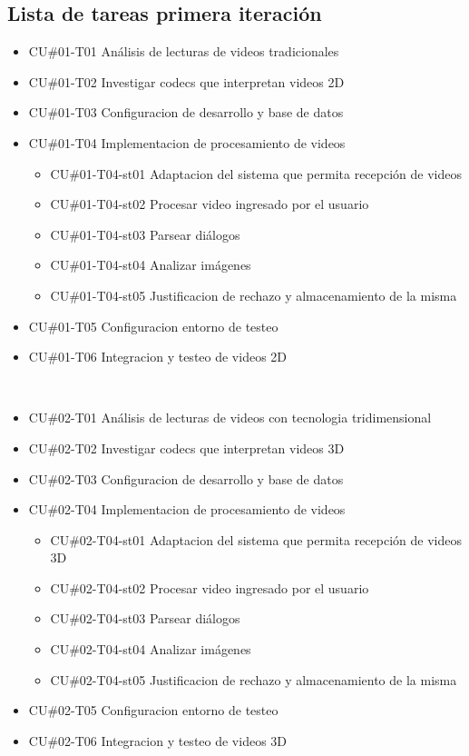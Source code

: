 \begin{enumerate}
\newpage
\subsection{Lista de tareas primera iteración}


\begin{itemize}
    \item CU\#01-T01 Análisis de lecturas de videos tradicionales
    \item CU\#01-T02 Investigar codecs que interpretan videos 2D
    \item CU\#01-T03 Configuracion de desarrollo y base de datos
    \item CU\#01-T04 Implementacion de procesamiento de videos
    \begin{itemize}
        \item CU\#01-T04-st01 Adaptacion del sistema que permita recepción de videos
        \item CU\#01-T04-st02 Procesar video ingresado por el usuario
        \item CU\#01-T04-st03 Parsear diálogos
        \item CU\#01-T04-st04 Analizar imágenes 
        \item CU\#01-T04-st05 Justificacion de rechazo y almacenamiento de la misma
    \end{itemize}
    \item CU\#01-T05 Configuracion entorno de testeo
    \item CU\#01-T06 Integracion y testeo de videos 2D
\end{itemize}
    
                   
\begin{itemize}
    \item CU\#02-T01 Análisis de lecturas de videos con tecnologia tridimensional
    \item CU\#02-T02 Investigar codecs que interpretan videos 3D
    \item CU\#02-T03 Configuracion de desarrollo y base de datos
    \item CU\#02-T04 Implementacion de procesamiento de videos
    \begin{itemize}
        \item CU\#02-T04-st01 Adaptacion del sistema que permita recepción de videos 3D
        \item CU\#02-T04-st02 Procesar video ingresado por el usuario
        \item CU\#02-T04-st03 Parsear diálogos
        \item CU\#02-T04-st04 Analizar imágenes 
        \item CU\#02-T04-st05 Justificacion de rechazo y almacenamiento de la misma
    \end{itemize}
    \item CU\#02-T05 Configuracion entorno de testeo
    \item CU\#02-T06 Integracion y testeo de videos 3D  
\end{itemize}



\end{enumerate}
